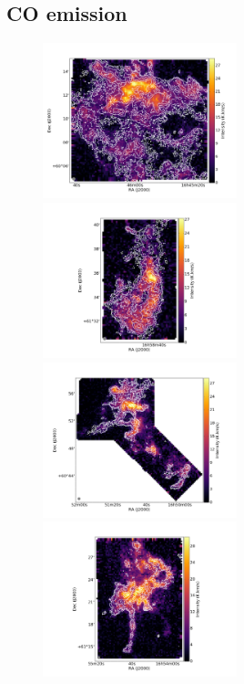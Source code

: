 \documentclass[traditabstract]{aa}
\begin{document}
   \subsection{CO emission}

\begin{figure}[h]
  \centering
  \includegraphics[height=4.5cm,trim=50 40 50 40,clip=true]{Figures/Draco1_stack.png}
  \hspace{3mm}
  \includegraphics[height=4.5cm,trim=50 40 50 40,clip=true]{Figures/Draco4_stack.png} \\
  \includegraphics[height=4.5cm,trim=50 40 50 40,clip=true]{Figures/Draco2+9_stack.png}
  \hspace{3mm}
  \includegraphics[height=4.5cm,trim=50 40 50 40,clip=true]{Figures/Draco5_stack.png} \\

\end{figure}
\end{document}

